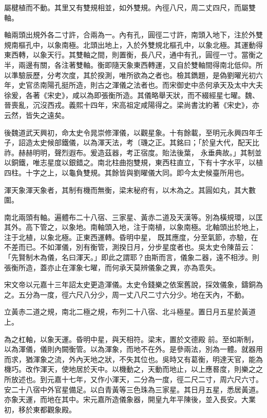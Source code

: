 \begin{pinyinscope}
 屬楗植而不動。其里又有雙規相並，如外雙規。內徑八尺，周二丈四尺，而屬雙軸。



 軸兩頭出規外各二寸許，合兩為一。內有孔，圓徑二寸許，南頭入地下，注於外雙規南樞孔中，以象南極。北頭出地上，入於外雙規北樞孔中，以象北極。其運動得東西轉，以象天行。其雙軸之間，則置衡，長八尺，通中有孔，圓徑一寸。當衡之半，兩邊有關，各注著雙軸。衡即隨天象東西轉運，又自於雙軸間得南北低仰。所
 以準驗辰歷，分考次度，其於揆測，唯所欲為之者也。檢其鐫題，是偽劉曜光初六年，史官丞南陽孔挺所造，則古之渾儀之法者也。而宋御史中丞何承天及太中大夫徐爰，各著《宋史》，咸以為即張衡所造。其儀略舉天狀，而不綴經星七曜。魏、晉喪亂，沉沒西戎。義熙十四年，宋高祖定咸陽得之。梁尚書沈約著《宋史》，亦云然，皆失之遠矣。



 後魏道武天興初，命太史令晁崇修渾儀，以觀星象。十有餘載，至明元永興四年壬子，詔造太史候部鐵儀，以為渾天法，考〔璣之正。其銘曰；「於皇大代，配天比祚。赫赫明明，聲烈遐布。爰造茲器，考正宿度。貽法後葉，
 永垂典故。」其制並以銅鐵，唯志星度以銀錯之。南北柱曲抱雙規，東西柱直立，下有十字水平，以植四柱。十字之上，以龜負雙規。其餘皆與劉曜儀大同。即今太史候臺所用也。



 渾天象渾天象者，其制有機而無衡，梁末秘府有，以木為之。其圓如丸，其大數圍。



 南北兩頭有軸。遍體布二十八宿、三家星、黃赤二道及天漢等。別為橫規環，以匡其外。高下管之，以象地。南軸頭入地，注于南植，以象南極。北軸頭出於地上，注于北植，以象北極。正東西運轉。昏明中星，
 既其應度，分至氣節，亦驗，在不差而已。不如渾儀，別有衡管，測揆日月，分步星度者也。吳太史令陳苗云：「先賢制木為儀，名曰渾天。」即此之謂耶？由斯而言，儀象二器，遠不相涉。則張衡所造，蓋亦止在渾象七曜，而何承天莫辨儀象之異，亦為乖失。



 宋文帝以元嘉十三年詔太史更造渾儀。太史令錢樂之依案舊說，採效儀象，鑄銅為之。五分為一度，徑六尺八分少，周一丈八尺二寸六分少。地在天內，不動。



 立黃赤二道之規，南北二極之規，布列二十八宿、北斗極星。置日月五星於黃道上。



 為之杠軸，以象天運。昏明中星，與天相符。梁末，置於文德殿
 前。至如斯制，以為渾儀，儀則內闕衡管。以為渾象，而地不在外。是參兩法，別為一體。就器用而求，猶渾象之流，外內天地之狀，不失其位也。吳時又有葛衡，明達天官，能為機巧。改作渾天，使地居於天中。以機動之，天動而地止，以上應晷度，則樂之之所放述也。到元嘉十七年，又作小渾天，二分為一度，徑二尺二寸，周六尺六寸。安二十八宿中外官星備足。以白青黃等三色珠為三家星。其日月五星，悉居黃道。亦象天運，而地在其中。宋元嘉所造儀象器，開皇九年平陳後，並入長安。大業初，移於東都觀象殿。




\end{pinyinscope}
